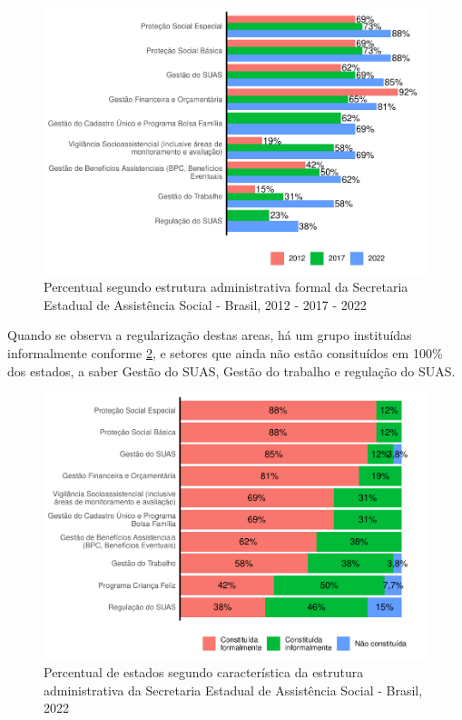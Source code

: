 \documentclass[
  brazilian]{report}
\begin{document}
\begin{figure}
\includegraphics{Censo-SUAS-2022_files/figure-latex/uf_subd-1} \caption[Percentual segundo estrutura administrativa formal da Secretaria Estadual de Assistência Social - Brasil, 2012 - 2017 - 2022]{Percentual segundo estrutura administrativa formal da Secretaria Estadual de Assistência Social - Brasil, 2012 - 2017 - 2022}\label{fig:uf_subd}
\end{figure}

Quando se observa a regularização destas areas, há um grupo instituídas
informalmente conforme \cref{fig:estados-constituicao-subdivisoes}, e
setores que ainda não estão consituídos em 100\% dos estados, a saber
Gestão do SUAS, Gestão do trabalho e regulação do SUAS.

\begin{figure}
\includegraphics{Censo-SUAS-2022_files/figure-latex/estados-constituicao-subdivisoes-1} \caption[Percentual de estados segundo característica da estrutura administrativa da Secretaria Estadual de Assistência Social - Brasil,  2022]{Percentual de estados segundo característica da estrutura administrativa da Secretaria Estadual de Assistência Social - Brasil,  2022}\label{fig:estados-constituicao-subdivisoes}
\end{figure}
\end{document}
